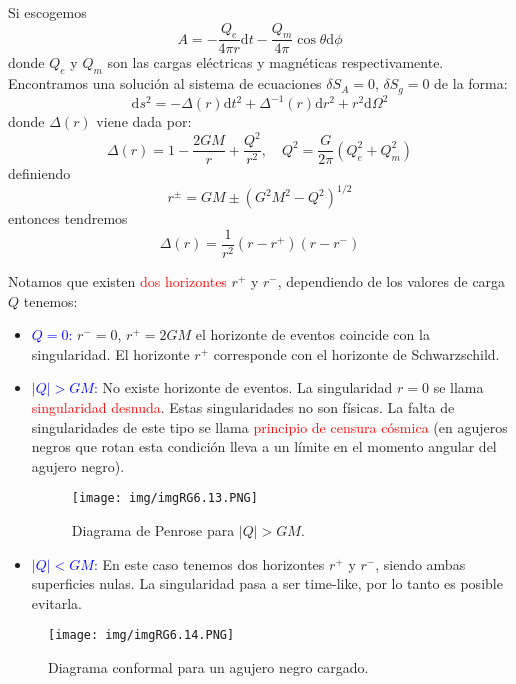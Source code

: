 \documentclass[../main]{subfiles}
\begin{document}
Si escogemos 
\begin{equation}
    A=-\dfrac{Q_e}{4\pi r}\mathrm{d}t-\dfrac{Q_m}{4\pi}\cos \theta \mathrm{d}\phi
\end{equation}
donde $Q_e$ y $Q_m$ son las cargas eléctricas y magnéticas respectivamente. Encontramos una solución al sistema de ecuaciones $\delta S_A=0$, $\delta S_g=0$ de la forma:
\begin{equation}
    \mathrm{d}s^2=-\Delta(r)\mathrm{d}t^2+\Delta^{-1}(r)\mathrm{d}r^2+r^2\mathrm{d}\Omega^2
\end{equation}
donde $\Delta(r)$ viene dada por:
\begin{equation}
    \Delta(r)=1-\dfrac{2GM}{r}+\dfrac{Q^2}{r^2},\quad Q^2=\dfrac{G}{2\pi}(Q^2_e+Q^2_m)
\end{equation}
definiendo 
\begin{equation}
    r^{\pm}=GM\pm (G^2M^2-Q^2)^{1/2}
\end{equation}
entonces tendremos
\begin{equation}
    \Delta(r)=\dfrac{1}{r^2}(r-r^+)(r-r^-)
\end{equation}

Notamos que existen \textcolor{red}{dos horizontes} $r^+$ y $r^-$, dependiendo de los valores de carga $Q$ tenemos:
\begin{itemize}
    \item \textcolor{blue}{$Q=0$:} $r^-=0$, $r^+=2GM$ el horizonte de eventos coincide con la singularidad. El horizonte $r^+$ corresponde con el horizonte de Schwarzschild.
    \item \textcolor{blue}{$|Q|>GM$:} No existe horizonte de eventos. La singularidad $r=0$ se llama \textcolor{red}{singularidad desnuda}. Estas singularidades no son físicas. La falta de singularidades de este tipo se llama \textcolor{red}{principio de censura cósmica} (en agujeros negros que rotan esta condición lleva a un límite en el momento angular del agujero negro).
    \begin{figure}[h]
        \centering
        \texttt{[image: img/imgRG6.13.PNG]}
        \caption{Diagrama de Penrose para $|Q|>GM$.}
    \end{figure}
    \item \textcolor{blue}{$|Q|<GM$:} En este caso tenemos dos horizontes $r^+$ y $r^-$, siendo ambas superficies nulas. La singularidad pasa a ser time-like, por lo tanto es posible evitarla.
\end{itemize}
\begin{figure}[h]
    \centering
    \texttt{[image: img/imgRG6.14.PNG]}
    \caption{Diagrama conformal para un agujero negro cargado.}
\end{figure}
\end{document}
